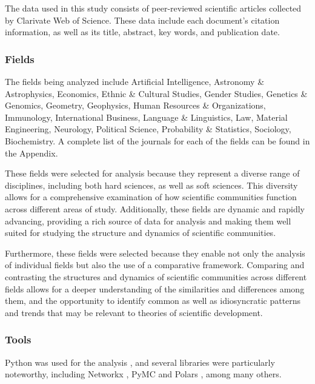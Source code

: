 The data used in this study consists of peer-reviewed scientific articles collected by Clarivate Web of Science. These data include each document's citation information, as well as its title, 
abstract, key words, and publication date.

\subsubsection{Fields}

The fields being analyzed include Artificial Intelligence, Astronomy \& Astrophysics, Economics, Ethnic \& Cultural Studies, Gender Studies, Genetics \& Genomics, Geometry, Geophysics, Human Resources \& Organizations, Immunology, International Business, Language \& Linguistics, Law, Material Engineering, Neurology, Political Science, Probability \& Statistics, Sociology, Biochemistry. A complete list of the journals for each of the fields can be found in the Appendix.

These fields were selected for analysis because they represent a diverse range of disciplines, including both hard sciences, as well as soft sciences. This diversity allows for a comprehensive examination of how scientific communities function across different areas of study. Additionally, these fields are dynamic and rapidly advancing, providing a rich source of data for analysis and making them well suited for studying the structure and dynamics of scientific communities. 

Furthermore, these fields were selected because they enable not only the analysis of individual fields but also the use of a comparative framework. Comparing and contrasting the structures and dynamics of scientific communities across different fields allows for a deeper understanding of the similarities and differences among them, and the opportunity to identify common as well as idiosyncratic patterns and trends that may be relevant to theories of scientific development.

\subsubsection{Tools}

Python was used for the analysis \citep{rossum2010}, and several libraries were particularly noteworthy, including Networkx \citep{hagberg2008}, PyMC \citep{wiecki2023} and Polars \citep{vink2023}, among many others.
